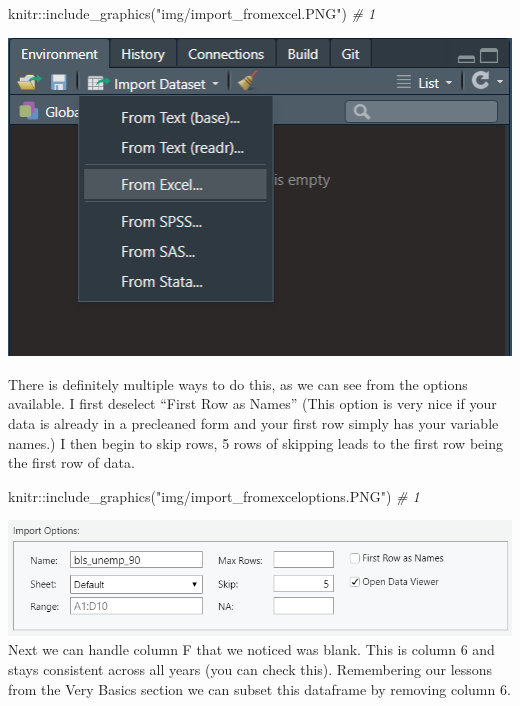 \documentclass[
]{book}
\newenvironment{Shaded}{\begin{snugshade}}{\end{snugshade}}
\newcommand{\CommentTok}[1]{\textcolor[rgb]{0.56,0.35,0.01}{\textit{#1}}}
\newcommand{\FunctionTok}[1]{\textcolor[rgb]{0.00,0.00,0.00}{#1}}
\newcommand{\NormalTok}[1]{#1}
\newcommand{\SpecialCharTok}[1]{\textcolor[rgb]{0.00,0.00,0.00}{#1}}
\newcommand{\StringTok}[1]{\textcolor[rgb]{0.31,0.60,0.02}{#1}}
\begin{document}
\begin{Shaded}
\begin{Highlighting}[]
\NormalTok{knitr}\SpecialCharTok{::}\FunctionTok{include\_graphics}\NormalTok{(}\StringTok{"img/import\_fromexcel.PNG"}\NormalTok{)  }\CommentTok{\# 1}
\end{Highlighting}
\end{Shaded}

\includegraphics[width=6.99in]{img/import_fromexcel}

There is definitely multiple ways to do this, as we can see from the options available. I first deselect ``First Row as Names'' (This option is very nice if your data is already in a precleaned form and your first row simply has your variable names.) I then begin to skip rows, 5 rows of skipping leads to the first row being the first row of data.

\begin{Shaded}
\begin{Highlighting}[]
\NormalTok{knitr}\SpecialCharTok{::}\FunctionTok{include\_graphics}\NormalTok{(}\StringTok{"img/import\_fromexceloptions.PNG"}\NormalTok{)  }\CommentTok{\# 1}
\end{Highlighting}
\end{Shaded}

\includegraphics[width=11.04in]{img/import_fromexceloptions}
Next we can handle column F that we noticed was blank. This is column 6 and stays consistent across all years (you can check this). Remembering our lessons from the Very Basics section we can subset this dataframe by removing column 6.
\end{document}
